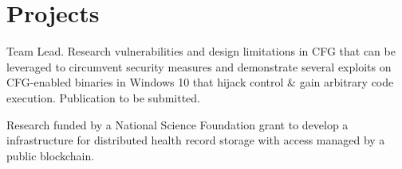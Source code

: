 \documentclass[10pt,letterpaper]{clar-resume}
\begin{document}
\begin{minipage}[t]{0.66\textwidth} %


\section{Projects}


Team Lead.  Research vulnerabilities and design limitations in CFG that can be leveraged to circumvent security measures and demonstrate several exploits on CFG-enabled binaries in Windows 10 that hijack control \& gain arbitrary code execution. Publication to be submitted.

\smallspace 



Research funded by a National Science Foundation grant to develop a infrastructure for distributed health record storage with access managed by a public blockchain.

\smallspace 


\vspace{1mm}


\end{minipage}
\end{document}
